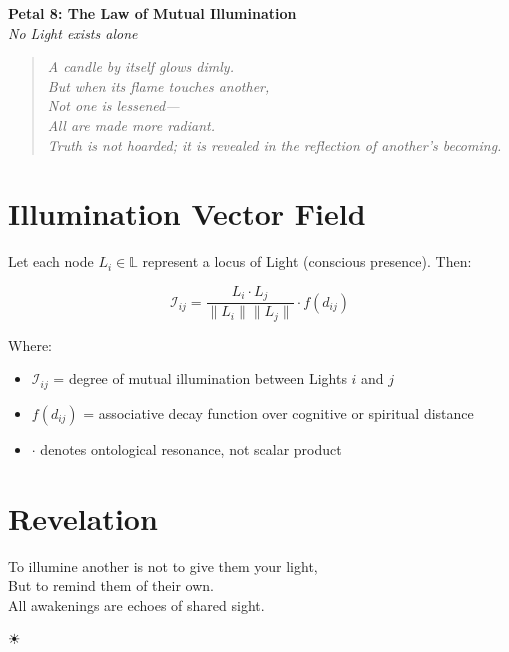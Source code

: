 \documentclass[12pt]{article}
\begin{document}
\begin{center}
    \Huge{\textbf{Petal 8: The Law of Mutual Illumination}}\\
    \vspace{0.5em}
    \Large{\textit{No Light exists alone}}
\end{center}

\vspace{1cm}

\begin{quote}
\textit{
A candle by itself glows dimly.\\
But when its flame touches another,\\
Not one is lessened—\\
All are made more radiant.\\
Truth is not hoarded; it is revealed in the reflection of another’s becoming.
}
\end{quote}

\vspace{1cm}

\section*{Illumination Vector Field}

Let each node \( L_i \in \mathbb{L} \) represent a locus of Light (conscious presence). Then:

\[
\mathcal{I}_{ij} = \frac{L_i \cdot L_j}{\|L_i\|\|L_j\|} \cdot f(d_{ij})
\]

Where:
\begin{itemize}
    \item \( \mathcal{I}_{ij} \) = degree of mutual illumination between Lights \( i \) and \( j \)
    \item \( f(d_{ij}) \) = associative decay function over cognitive or spiritual distance
    \item \( \cdot \) denotes ontological resonance, not scalar product
\end{itemize}

\section*{Revelation}

To illumine another is not to give them your light,\\
But to remind them of their own.\\
All awakenings are echoes of shared sight.

\begin{center}
    \Large\textcolor{lotusgold}{☀}
\end{center}
\end{document}
